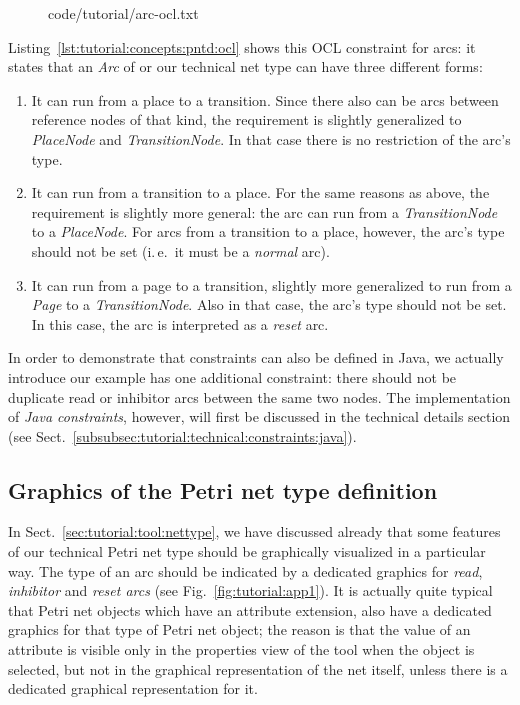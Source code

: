 \begin{figure}[htbp!]
%
  {code/tutorial/arc-ocl.txt}
\end{figure}

Listing~\ref{lst:tutorial:concepts:pntd:ocl} shows this  OCL constraint for
arcs: it states that an \emph{Arc} of or our technical net type can
have three different forms:
\begin{enumerate}
  \item It can run from a place to a transition. Since there also can
        be arcs between reference nodes of that kind, the requirement
        is slightly generalized to \emph{PlaceNode} and \emph{TransitionNode}.
        In that case there is no restriction of the arc's type.
        
  \item It can run from a transition to a place. For the same reasons as
        above, the requirement is slightly more general: the arc can run
        from a \emph{TransitionNode} to a \emph{PlaceNode}. For arcs from
        a transition to a place, however, the arc's type should not be set
        (i.\,e.\ it must be a \emph{normal} arc).
        
  \item It can run from a page to a transition, slightly more generalized to
        run from a \emph{Page} to a \emph{TransitionNode}. Also in that case,
        the arc's type should not be set. In this case, the arc is interpreted
        as a \emph{reset} arc.
\end{enumerate}

In order to demonstrate that constraints can also be defined in
Java, we actually introduce our example has one additional constraint: there
should not be duplicate read or inhibitor arcs between the same two nodes.
The implementation of \emph{Java constraints}, however, will first be discussed
in the technical details section (see
Sect.~\ref{subsubsec:tutorial:technical:constraints:java}).

\subsection{Graphics of the Petri net type definition}
\label{subsec:tutorial:concepts:graphics}

In Sect.~\ref{sec:tutorial:tool:nettype}, we have discussed already that some
features of our technical Petri net type should be graphically visualized in
a particular way. The type of an arc should be indicated by a dedicated
graphics for \emph{read}, \emph{inhibitor} and \emph{reset arcs} (see
Fig.~\ref{fig:tutorial:app1}). It is actually quite typical that Petri net
objects which have an attribute extension, also have a dedicated graphics for
that type of Petri net object; the reason is that the value of an attribute
is visible only in the properties view of the tool when the object is
selected, but not in the graphical representation of the net itself, unless
there is a dedicated graphical representation for it.

